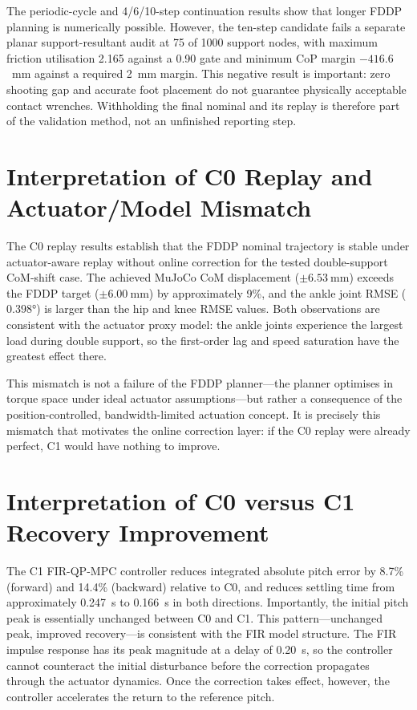 \documentclass[12pt,a4paper]{report}
\begin{document}
The periodic-cycle and 4/6/10-step continuation results show that longer FDDP planning is numerically possible. However, the ten-step candidate fails a separate planar support-resultant audit at 75 of 1000 support nodes, with maximum friction utilisation 2.165 against a 0.90 gate and minimum CoP margin $-416.6$~mm against a required 2~mm margin. This negative result is important: zero shooting gap and accurate foot placement do not guarantee physically acceptable contact wrenches. Withholding the final nominal and its replay is therefore part of the validation method, not an unfinished reporting step.
 
\section{Interpretation of C0 Replay and Actuator/Model Mismatch}
 
The C0 replay results establish that the FDDP nominal trajectory is stable under actuator-aware replay without online correction for the tested double-support CoM-shift case. The achieved MuJoCo CoM displacement ($\pm\SI{6.53}{\milli\metre}$) exceeds the FDDP target ($\pm\SI{6.00}{\milli\metre}$) by approximately 9\%, and the ankle joint RMSE ($\ang{0.398}$) is larger than the hip and knee RMSE values. Both observations are consistent with the actuator proxy model: the ankle joints experience the largest load during double support, so the first-order lag and speed saturation have the greatest effect there.
 
This mismatch is not a failure of the FDDP planner---the planner optimises in torque space under ideal actuator assumptions---but rather a consequence of the position-controlled, bandwidth-limited actuation concept. It is precisely this mismatch that motivates the online correction layer: if the C0 replay were already perfect, C1 would have nothing to improve.
 
\section{Interpretation of C0 versus C1 Recovery Improvement}
 
The C1 FIR-QP-MPC controller reduces integrated absolute pitch error by 8.7\% (forward) and 14.4\% (backward) relative to C0, and reduces settling time from approximately \SI{0.247}{\second} to \SI{0.166}{\second} in both directions. Importantly, the initial pitch peak is essentially unchanged between C0 and C1. This pattern---unchanged peak, improved recovery---is consistent with the FIR model structure. The FIR impulse response has its peak magnitude at a delay of \SI{0.20}{\second}, so the controller cannot counteract the initial disturbance before the correction propagates through the actuator dynamics. Once the correction takes effect, however, the controller accelerates the return to the reference pitch.
 
\end{document}
